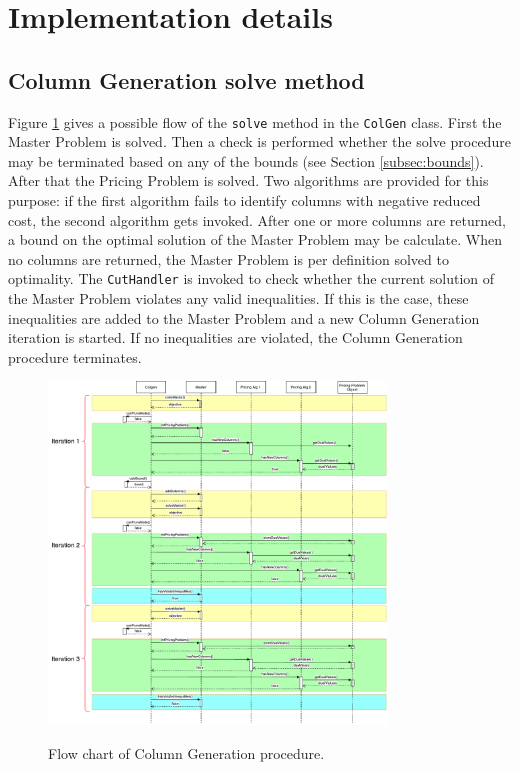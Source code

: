 \documentclass[a4paper]{article}
\newcommand{\code}[1]{\lstinline[language=java, style=seminar]!#1!}
\begin{document}
\section{Implementation details}

\subsection{Column Generation solve method}
Figure \ref{fig:cg_flowChart} gives a possible flow of the \code{solve} method in the \code{ColGen} class. First the Master Problem is solved. Then a check is performed whether the solve procedure may be terminated based on any of the bounds (see Section \ref{subsec:bounds}). After that the Pricing Problem is solved. Two algorithms are provided for this purpose: if the first algorithm fails to identify columns with negative reduced cost, the second algorithm gets invoked. After one or more columns are returned, a bound on the optimal solution of the Master Problem may be calculate. When no columns are returned, the Master Problem is per definition solved to optimality. The \code{CutHandler} is invoked to check whether the current solution of the Master Problem violates any valid inequalities. If this is the case, these inequalities are added to the Master Problem and a new Column Generation iteration is started. If no inequalities are violated, the Column Generation procedure terminates.

\begin{figure}[h!]
  \caption{Flow chart of Column Generation procedure.}
  \centering
    \includegraphics[width=0.8\textwidth]{figures/CG_flowChart}
  \label{fig:cg_flowChart}
\end{figure}
\end{document}
